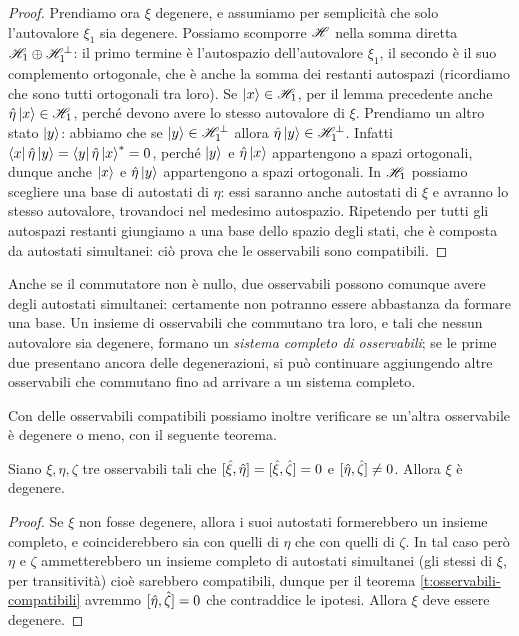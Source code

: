 \begin{proof}
	Prendiamo ora $\xi$ degenere, e assumiamo per semplicità che solo l'autovalore $\xi_1$ sia degenere.
	Possiamo scomporre $\mathscr H$ nella somma diretta $\mathscr H_1\oplus\mathscr H^\perp_1$: il primo termine è l'autospazio dell'autovalore $\xi_1$, il secondo è il suo complemento ortogonale, che è anche la somma dei restanti autospazi (ricordiamo che sono tutti ortogonali tra loro).
	Se $\left|{x}\right\rangle\in\mathscr H_1$, per il lemma precedente anche $\hat{\eta}\left|{x}\right\rangle\in\mathscr H_1$, perch\'e devono avere lo stesso autovalore di $\xi$.
	Prendiamo un altro stato $\left|{y}\right\rangle$: abbiamo che se $\left|{y}\right\rangle\in\mathscr H_1^\perp$ allora $\hat{\eta}\left|{y}\right\rangle\in\mathscr H_1^\perp$.
	Infatti $\left\langle{x}\right|\hat{\eta}\left|{y}\right\rangle=\left\langle{y}\right|\hat{\eta}\left|{x}\right\rangle^*=0$, perch\'e $\left|{y}\right\rangle$ e $\hat{\eta}\left|{x}\right\rangle$ appartengono a spazi ortogonali, dunque anche $\left|{x}\right\rangle$ e $\hat{\eta}\left|{y}\right\rangle$ appartengono a spazi ortogonali.
	In $\mathscr H_1$ possiamo scegliere una base di autostati di $\eta$: essi saranno anche autostati di $\xi$ e avranno lo stesso autovalore, trovandoci nel medesimo autospazio.
	Ripetendo per tutti gli autospazi restanti giungiamo a una base dello spazio degli stati, che è composta da autostati simultanei: ciò prova che le osservabili sono compatibili.
\end{proof}
Anche se il commutatore non è nullo, due osservabili possono comunque avere degli autostati simultanei: certamente non potranno essere abbastanza da formare una base.
Un insieme di osservabili che commutano tra loro, e tali che nessun autovalore sia degenere, formano un \emph{sistema completo di osservabili}; se le prime due presentano ancora delle degenerazioni, si può continuare aggiungendo altre osservabili che commutano fino ad arrivare a un sistema completo.

Con delle osservabili compatibili possiamo inoltre verificare se un'altra osservabile è degenere o meno, con il seguente teorema.
\begin{teorema} \label{t:degenerazione}
	Siano $\xi,\eta,\zeta$ tre osservabili tali che $[\hat{\xi},\hat{\eta}]=[\hat{\xi},\hat{\zeta}]=0$ e $[\hat{\eta},\hat{\zeta}]\ne 0$.
	Allora $\xi$ è degenere.
\end{teorema}
\begin{proof}
	Se $\xi$ non fosse degenere, allora i suoi autostati formerebbero un insieme completo, e coinciderebbero sia con quelli di $\eta$ che con quelli di $\zeta$.
	In tal caso però $\eta$ e $\zeta$ ammetterebbero un insieme completo di autostati simultanei (gli stessi di $\xi$, per transitività) cioè sarebbero compatibili, dunque per il teorema \ref{t:osservabili-compatibili} avremmo $[\hat{\eta},\hat{\zeta}]=0$ che contraddice le ipotesi.
	Allora $\xi$ deve essere degenere.
\end{proof}

